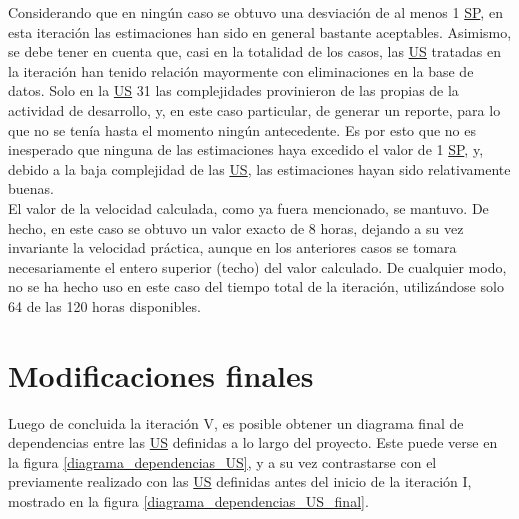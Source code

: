 \documentclass[a4paper, 12pt,twoside]{report}  %
\numberwithin{equation}{subsection} %
\begin{document}
\indent Considerando que en ningún caso se obtuvo una desviación de al menos 1 \hyperlink{SP}{SP}, en esta iteración las estimaciones han sido en general bastante aceptables. Asimismo, se debe tener en cuenta que, casi en la totalidad de los casos, las \hyperlink{US}{US} tratadas en la iteración han tenido relación mayormente con eliminaciones en la base de datos. Solo en la \hyperlink{US}{US} 31 las complejidades provinieron de las propias de la actividad de desarrollo, y, en este caso particular, de generar un reporte, para lo que no se tenía hasta el momento ningún antecedente. Es por esto que no es inesperado que ninguna de las estimaciones haya excedido el valor de 1 \hyperlink{SP}{SP}, y, debido a la baja complejidad de las \hyperlink{US}{US}, las estimaciones hayan sido relativamente buenas.\\
\indent El valor de la velocidad calculada, como ya fuera mencionado, se mantuvo. De hecho, en este caso se obtuvo un valor exacto de 8 horas, dejando a su vez invariante la velocidad práctica, aunque en los anteriores casos se tomara necesariamente el entero superior (techo) del valor calculado. De cualquier modo, no se ha hecho uso en este caso del tiempo total de la iteración, utilizándose solo 64 de las 120 horas disponibles.

\section{Modificaciones finales}
Luego de concluida la iteración V, es posible obtener un diagrama final de dependencias entre las \hyperlink{US}{US} definidas a lo largo del proyecto. Este puede verse en la figura \ref{diagrama_dependencias_US}, y a su vez contrastarse con el previamente realizado con las \hyperlink{US}{US} definidas antes del inicio de la iteración I, mostrado en la figura \ref{diagrama_dependencias_US_final}.
\end{document}
